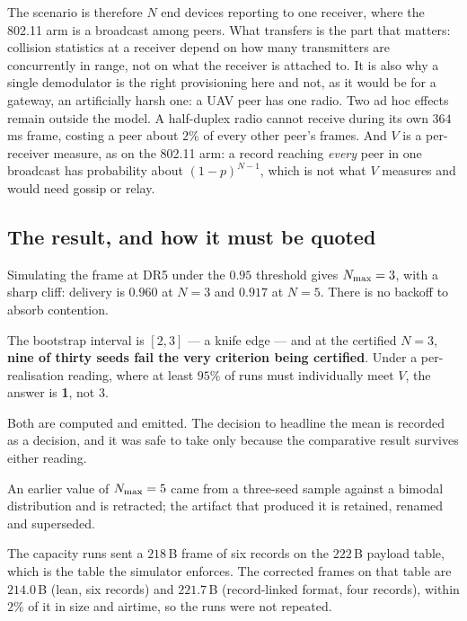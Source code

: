 The scenario is therefore $N$ end devices reporting to one receiver, where the 802.11 arm is a
broadcast among peers. What transfers is the part that matters: collision statistics at a
receiver depend on how many transmitters are concurrently in range, not on what the receiver is
attached to. It is also why a single demodulator is the right provisioning here and not, as it
would be for a gateway, an artificially harsh one: a UAV peer has one radio. Two ad hoc effects
remain outside the model. A half-duplex radio cannot receive during its own $364$\,ms frame,
costing a peer about $2\%$ of every other peer's frames. And $V$ is a per-receiver measure, as on
the 802.11 arm: a record reaching \emph{every} peer in one broadcast has probability about
$(1-p)^{N-1}$, which is not what $V$ measures and would need gossip or relay.

\subsection{The result, and how it must be quoted}

Simulating the frame at DR5 under the $0.95$ threshold gives $N_{\max} = 3$, with a sharp cliff:
delivery is $0.960$ at $N{=}3$ and $0.917$ at $N{=}5$. There is no backoff to absorb contention.

\begin{remark}
The bootstrap interval is $[2, 3]$ --- a knife edge --- and at the certified $N = 3$, \textbf{nine of
thirty seeds fail the very criterion being certified}. Under a per-realisation reading, where at
least $95\%$ of runs must individually meet $V$, the answer is \textbf{1}, not 3.

Both are computed and emitted. The decision to headline the mean is recorded as a decision, and it
was safe to take only because the comparative result survives either reading.
\end{remark}

An earlier value of $N_{\max} = 5$ came from a three-seed sample against a bimodal distribution and is
retracted; the artifact that produced it is retained, renamed and superseded.

The capacity runs sent a $218$\,B frame of six records on the $222$\,B payload table, which is the
table the simulator enforces. The corrected frames on that table are $214.0$\,B (lean, six
records) and $221.7$\,B (record-linked format, four records), within $2\%$ of it in size and airtime, so
the runs were not repeated.

